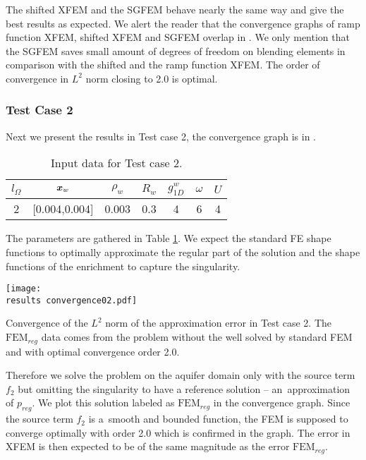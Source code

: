 The shifted XFEM and the SGFEM behave nearly the same way and give the best results as expected.
We alert the reader that the convergence graphs of ramp function XFEM, shifted XFEM and SGFEM overlap in .
We only mention that the SGFEM saves small amount of degrees of freedom on blending elements in comparison
with the shifted and the ramp function XFEM. The order of convergence in $L^2$ norm closing to 2.0 is optimal.


\subsubsection{Test Case 2}
Next we present the results in Test case 2, the convergence graph is in .
%
\begin{table}[!htb]
\begin{center}
\begin{tabular}{ccccccc}
\toprule
$l_\Omega$ & $\mathbf{\boldsymbol{x}}_w$  & $\rho_w$ & $R_w$ & $g^w_{1D}$ & $\omega$ & $U$ \\
\midrule
2 & [0.004,0.004] & 0.003 & 0.3 & 4 & 6 & 4\\
\bottomrule
\end{tabular}
\caption{Input data for Test case 2.}
\label{tab:test_case_2_data}
\end{center}
\end{table}
%
The parameters are gathered in Table \ref{tab:test_case_2_data}.
We expect the standard FE shape functions to optimally approximate the regular part of the solution
and the shape functions of the enrichment to capture the singularity.
%
\begin{graph}[!htb]
  \centering    
  \texttt{[image: \\results convergence02.pdf]}
  \caption[Convergence graph in Test case 2.]{Convergence of the $L^2$ norm of the approximation error in Test case 2. The $\textrm{FEM}_{reg}$
  data comes from the problem without the well solved by standard FEM and with optimal convergence order 2.0.}
  \label{graph:convergence02}
\end{graph}
%
Therefore we solve the problem on the aquifer domain only with the source term $f_2$ but omitting the singularity
to have a reference solution -- an~approximation of $p_{reg}$. We plot this solution labeled as $\textrm{FEM}_{reg}$ in the convergence graph.
Since the source term $f_2$ is a~smooth and bounded function, the FEM is supposed to converge optimally with order 2.0
which is confirmed in the graph.
The error in XFEM is then expected to be of the same magnitude as the error $\textrm{FEM}_{reg}$.

